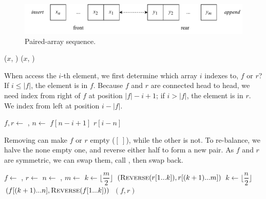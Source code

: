\documentclass[b5paper]{article}
\begin{document}
\begin{figure}[htbp]
  \centering
  \includegraphics[scale=0.7]{img/parrays}
  \caption{Paired-array sequence.}
  \label{fig:parrays}
\end{figure}

\begin{algorithmic}[1]
  \State {}($x$, )
\EndFunction
{}
  \State {}($x$, )
\EndFunction
\end{algorithmic}


When access the $i$-th element, we first determine which array $i$ indexes to, $f$ or $r$? If $ i \leq |f|$, the element is in $f$. Because $f$ and $r$ are connected head to head, we need index from right of $f$ at position $|f| - i + 1$; if $i > |f|$, the element is in $r$. We index from left at position $i - |f|$.

\begin{algorithmic}[1]
  \State $f, r \gets $ , 
  \State $n \gets $ 
    \State \Return $f[n - i + 1]$ 
  \Else
    \State \Return $r[i - n]$
  \EndIf
\EndFunction
\end{algorithmic}

Removing can make $f$ or $r$ empty ($[\ ]$), while the other is not. To re-balance, we halve the none empty one, and reverse either half to form a new pair. As $f$ and $r$ are symmetric, we can swap them, call , then swap back.

\begin{algorithmic}[1]
  \State $f \gets$ , $r \gets$ 
  \State $n \gets$ , $m \gets$ 
    \State $k \gets \lfloor \dfrac{m}{2} \rfloor$
    \State \Return $(\textproc{Reverse}(r[1 ... k]), r[(k + 1) ... m])$
  \EndIf
    \State $k \gets \lfloor \dfrac{n}{2} \rfloor$
    \State \Return $(f[(k + 1) ... n], \textproc{Reverse}(f[1 ... k]))$
  \EndIf
  \State \Return $(f, r)$
\EndFunction
\end{algorithmic}
\end{document}
